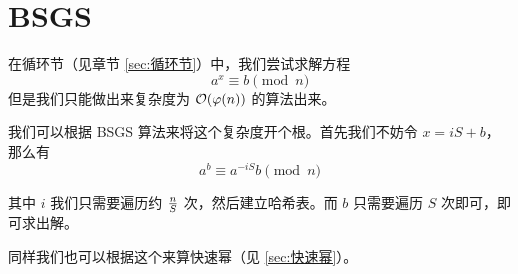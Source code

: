 \section{BSGS} \label{sec:BSGS}
在循环节（见章节 \ref{sec:循环节}）中，我们尝试求解方程\[
    a^x \equiv b \pmod n
\]
但是我们只能做出来复杂度为 $\mathcal{O}(\varphi(n))$ 的算法出来。

我们可以根据 BSGS 算法来将这个复杂度开个根。首先我们不妨令 $x = iS + b$，那么有\[
    a^b \equiv a^{-iS} b \pmod n
\]

其中 $i$ 我们只需要遍历约 $n \over S$ 次，然后建立哈希表。而 $b$ 只需要遍历 $S$
次即可，即可求出解。

同样我们也可以根据这个来算快速幂（见 \ref{sec:快速幂}）。

